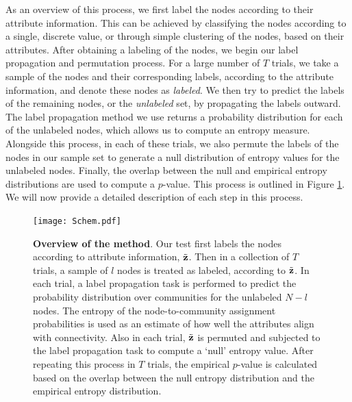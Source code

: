 \indent As an overview of this process, we first label the nodes according to their attribute information. This can be achieved by classifying the nodes according to a single, discrete value, or through simple clustering of the nodes, based on their attributes. After obtaining a labeling of the nodes, we begin our label propagation and permutation process. For a large number of $T$ trials, we take a sample of the nodes and their corresponding labels, according to the attribute information, and denote these nodes as \emph{labeled}. We then try to predict the labels of the remaining nodes, or the \emph{unlabeled} set, by propagating the labels outward. The label propagation method we use returns a probability distribution for each of the unlabeled nodes, which allows us to compute an entropy measure. Alongside this process, in each of these trials, we also permute the labels of the nodes in our sample set to generate a null distribution of entropy values for the unlabeled nodes. Finally, the overlap between the null and empirical entropy distributions are used to compute a $p$-value. This process is outlined in Figure \ref{Overview}. We will now provide a detailed description of each step in this process. 

\begin{figure}[h!]
\centering
\begin{center}
\texttt{[image: Schem.pdf]}
\caption{{\bf Overview of the method}. Our test first labels the nodes according to attribute information, $\tilde{{\bf z}}$. Then in a collection of $T$ trials, a sample of $l$ nodes is treated as labeled, according to $\tilde{{\bf z}}$. In each trial, a label propagation task is performed to predict the probability distribution over communities for the unlabeled $N-l$ nodes. The entropy of the node-to-community assignment probabilities is used as an estimate of how well the attributes align with connectivity. Also in each trial, $\tilde{{\bf z}}$ is permuted and subjected to the label propagation task to compute a `null' entropy value. After repeating this process in $T$ trials, the empirical $p$-value is calculated based on the overlap between the null entropy distribution and the empirical entropy distribution.}
\label{Overview}
\end{center}
\end{figure}

